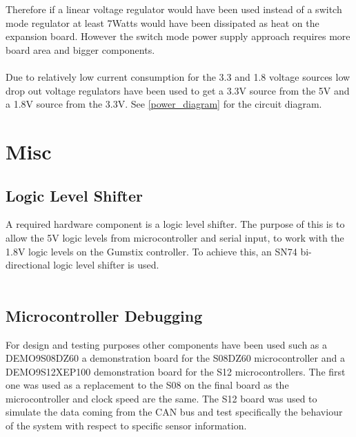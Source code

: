 \documentclass[11pt]{report} %
\begin{document}
	Therefore if a linear voltage regulator would have been used instead of a
	switch mode regulator at least 7Watts would have been dissipated as heat on the
	expansion board. However the switch mode power supply approach requires more
	board area and bigger components. \\
	\\
	Due to relatively low current consumption for the 3.3 and 1.8 voltage sources
	low drop out voltage regulators have been used to get a 3.3V source from the
	5V and a 1.8V source from the 3.3V. See \ref{power_diagram}
	for the circuit diagram. 

	\section{Misc}
	\subsection{Logic Level Shifter}
	A required hardware component is a logic level shifter. The purpose of this
	is to allow the 5V logic levels from microcontroller and serial input, to
	work with the 1.8V logic levels on the Gumstix controller. To achieve this,
	an SN74 bi-directional logic level shifter is used.\\
	\\
	\subsection{Microcontroller Debugging}
	For design and testing purposes other components have been used such as a 
	DEMO9S08DZ60 a demonstration board for the S08DZ60 microcontroller and a 
	DEMO9S12XEP100 demonstration board for the S12 microcontrollers. The first one
	was used as a replacement to the S08 on the final board as the microcontroller
	and clock speed are the same. The S12 board was used to simulate the data
	coming from the CAN bus and test specifically the behaviour of the system with
	respect to specific sensor information.
	\\
\end{document}
